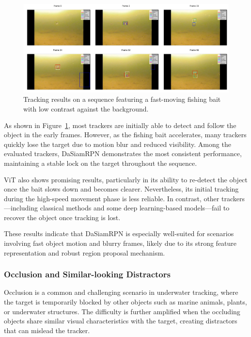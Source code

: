 \begin{figure}[ht]
    \centering
    \includegraphics[width=1\textwidth]{images/FishingBait.png}
    \caption{Tracking results on a sequence featuring a fast-moving fishing bait with low contrast against the background.}
    \label{fig:motion_blur_example}
\end{figure}

As shown in Figure~\ref{fig:motion_blur_example}, most trackers are initially able to detect and follow the object in the early frames. However, as the fishing bait accelerates, many trackers quickly lose the target due to motion blur and reduced visibility. Among the evaluated trackers, DaSiamRPN demonstrates the most consistent performance, maintaining a stable lock on the target throughout the sequence.

ViT also shows promising results, particularly in its ability to re-detect the object once the bait slows down and becomes clearer. Nevertheless, its initial tracking during the high-speed movement phase is less reliable. In contrast, other trackers—including classical methods and some deep learning-based models—fail to recover the object once tracking is lost.

These results indicate that DaSiamRPN is especially well-suited for scenarios involving fast object motion and blurry frames, likely due to its strong feature representation and robust region proposal mechanism.

\subsubsection{Occlusion and Similar-looking Distractors}

Occlusion is a common and challenging scenario in underwater tracking, where the target is temporarily blocked by other objects such as marine animals, plants, or underwater structures. The difficulty is further amplified when the occluding objects share similar visual characteristics with the target, creating distractors that can mislead the tracker.

